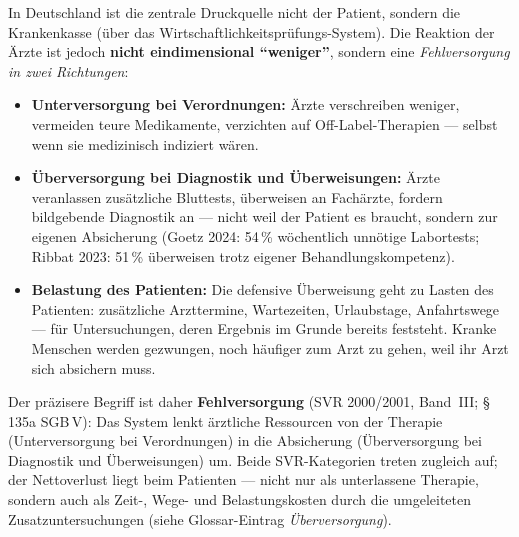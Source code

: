 \documentclass{umbruch-position}
\begin{document}
In Deutschland ist die zentrale Druckquelle nicht der Patient, sondern die Krankenkasse (über das Wirtschaftlichkeitsprüfungs-System). Die Reaktion der Ärzte ist jedoch \textbf{nicht eindimensional ``weniger''}, sondern eine \textit{Fehlversorgung in zwei Richtungen}:

\begin{itemize}[nosep]
  \item \textbf{Unterversorgung bei Verordnungen:} Ärzte verschreiben weniger, vermeiden teure Medikamente, verzichten auf Off-Label-Therapien --- selbst wenn sie medizinisch indiziert wären.
  \item \textbf{Überversorgung bei Diagnostik und Überweisungen:} Ärzte veranlassen zusätzliche Bluttests, überweisen an Fachärzte, fordern bildgebende Diagnostik an --- nicht weil der Patient es braucht, sondern zur eigenen Absicherung (Goetz 2024: 54\,\% wöchentlich unnötige Labortests; Ribbat 2023: 51\,\% überweisen trotz eigener Behandlungskompetenz).
  \item \textbf{Belastung des Patienten:} Die defensive Überweisung geht zu Lasten des Patienten: zusätzliche Arzttermine, Wartezeiten, Urlaubstage, Anfahrtswege --- für Untersuchungen, deren Ergebnis im Grunde bereits feststeht. Kranke Menschen werden gezwungen, noch häufiger zum Arzt zu gehen, weil ihr Arzt sich absichern muss.
\end{itemize}

\noindent Der präzisere Begriff ist daher \textbf{Fehlversorgung} (SVR 2000/2001, Band~III; \S\,135a SGB\,V): Das System lenkt ärztliche Ressourcen von der Therapie (Unterversorgung bei Verordnungen) in die Absicherung (Überversorgung bei Diagnostik und Überweisungen) um. Beide SVR-Kategorien treten zugleich auf; der Nettoverlust liegt beim Patienten --- nicht nur als unterlassene Therapie, sondern auch als Zeit-, Wege- und Belastungskosten durch die umgeleiteten Zusatzuntersuchungen (siehe Glossar-Eintrag \textit{Überversorgung}).
\end{document}
